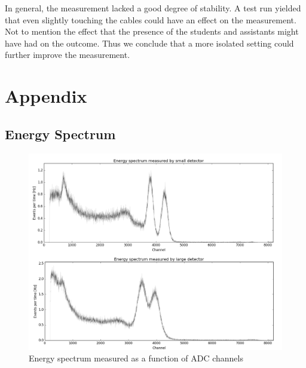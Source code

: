 \documentclass[a4paper,parskip,11pt, DIV12]{scrreprt}
\begin{document}
In general, the measurement lacked a good degree of stability. A test run yielded that even slightly touching the cables could have an effect on the measurement. Not to mention the effect that the presence of the students and assistants might have had on the outcome. Thus we conclude that a more isolated setting could further improve the measurement.



\chapter{Appendix}

\section{Energy Spectrum}
%
\begin{figure}[H]
\centering
\includegraphics[scale=0.35]{EnergyRaw.png}
\caption[EnergyRaw]{Energy spectrum measured as a function of ADC channels}
\label{fig:EnergyRaw}
\end{figure}
\end{document}
